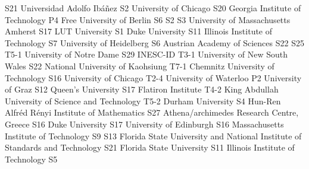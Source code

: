 \begin{multicols}{2}
{S21}
{}
{}
{}
{}
{}
{}
{Universidad Adolfo Ib\'a\~nez}
{S2}
{}
{}
{}
{}
{}
{}
{University of Chicago}
{S20}
{}
{}
{}
{}
{}
{}
{Georgia Institute of Technology}
{P4}
{}
{}
{}
{}
{}
{}
{Free University of Berlin}
{S6}
{S2}
{S3}
{}
{}
{}
{}
{University of Massachusetts Amherst}
{S17}
{}
{}
{}
{}
{}
{}
{LUT University}
{S1}
{}
{}
{}
{}
{}
{}
{Duke University}
{S11}
{}
{}
{}
{}
{}
{}
{Illinois Institute of Technology}
{S7}
{}
{}
{}
{}
{}
{}
{University of Heidelberg}
{S6}
{}
{}
{}
{}
{}
{}
{Austrian Academy of Sciences}
{S22}
{S25}
{T5-1}
{}
{}
{}
{}
{University of Notre Dame}
{S29}
{}
{}
{}
{}
{}
{}
{INESC-ID}
{T3-1}
{}
{}
{}
{}
{}
{}
{University of New South Wales}
{S22}
{}
{}
{}
{}
{}
{}
{National University of Kaohsiung}
{T7-1}
{}
{}
{}
{}
{}
{}
{Chemnitz University of Technology}
{S16}
{}
{}
{}
{}
{}
{}
{University of Chicago}
{T2-4}
{}
{}
{}
{}
{}
{}
{University of Waterloo}
{P2}
{}
{}
{}
{}
{}
{}
{University of Graz}
{S12}
{}
{}
{}
{}
{}
{}
{Queen's University}
{S17}
{}
{}
{}
{}
{}
{}
{Flatiron Institute}
{T4-2}
{}
{}
{}
{}
{}
{}
{King Abdullah University of Science and Technology}
{T5-2}
{}
{}
{}
{}
{}
{}
{Durham University}
{S4}
{}
{}
{}
{}
{}
{}
{Hun-Ren Alfr\'ed R\'enyi Institute of Mathematics}
{S27}
{}
{}
{}
{}
{}
{}
{Athena/archimedes Research Centre, Greece}
{S16}
{}
{}
{}
{}
{}
{}
{Duke University}
{S17}
{}
{}
{}
{}
{}
{}
{University of Edinburgh}
{S16}
{}
{}
{}
{}
{}
{}
{Massachusetts Institute of Technology}
{S9}
{S13}
{}
{}
{}
{}
{}
{Florida State University and National Institute of Standards and Technology}
{S21}
{}
{}
{}
{}
{}
{}
{Florida State University}
{S11}
{}
{}
{}
{}
{}
{}
{Illinois Institute of Technology}
{S5}
{}
{}
{}
{}
{}
{}

\end{multicols}
